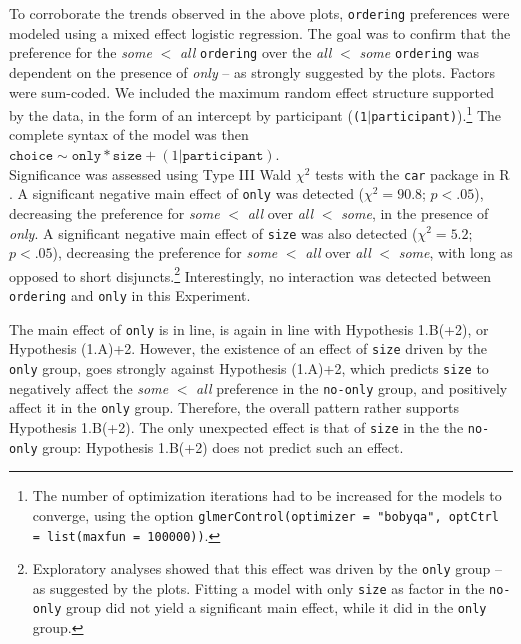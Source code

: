To corroborate the trends observed in the above plots, \texttt{ordering} preferences were modeled using a mixed effect logistic regression. The goal was to confirm that the preference for the \textit{some} $<$ \textit{all} \texttt{ordering} over the \textit{all} $<$ \textit{some} \texttt{ordering} was dependent on the presence of \textit{only} -- as strongly suggested by the plots. Factors were sum-coded. We included the maximum random effect structure supported by the data, in the form of an intercept by participant (\texttt{(1$|$participant)}).\footnote{The number of optimization iterations had to be increased for the models to converge, using the option \texttt{glmerControl(optimizer = "bobyqa", optCtrl = list(maxfun = 100000))}.} The complete syntax of the model was then $\texttt{choice} \sim \texttt{only}*\texttt{size} + (1|\texttt{participant})$.\\ %


Significance was assessed using Type III Wald $\chi^2$ tests with the \texttt{car} package in R \parencite{Fox2019}. 
A significant negative main effect of \texttt{only} was detected ($\chi^2 = 90.8$; $p<.05$), decreasing the preference for \textit{some} $<$ \textit{all} over \textit{all} $<$ \textit{some}, in the presence of \textit{only}.
A significant negative main effect of \texttt{size} was also detected ($\chi^2 = 5.2$; $p<.05$), decreasing the preference for \textit{some} $<$ \textit{all} over \textit{all} $<$ \textit{some}, with long as opposed to short disjuncts.\footnote{Exploratory analyses showed that this effect was driven by the \texttt{only} group -- as suggested by the plots. Fitting a model with only \texttt{size} as factor in the \texttt{no-only} group did not yield a significant main effect, while it did in the \texttt{only} group.}
Interestingly, no interaction was detected between \texttt{ordering} and \texttt{only} in this Experiment.


The main effect of \texttt{only} is in line, is again in line with Hypothesis 1.B(+2), or Hypothesis (1.A)+2. However, the existence of an effect of \texttt{size} driven by the \texttt{only} group, goes strongly against Hypothesis (1.A)+2, which predicts \texttt{size} to negatively affect the \textit{some} $<$ \textit{all} preference in the \texttt{no-only} group, and positively affect it in the \texttt{only} group. Therefore, the overall pattern rather supports Hypothesis 1.B(+2). The only unexpected effect is that of \texttt{size} in the the \texttt{no-only} group: Hypothesis 1.B(+2) does not predict such an effect.\\

